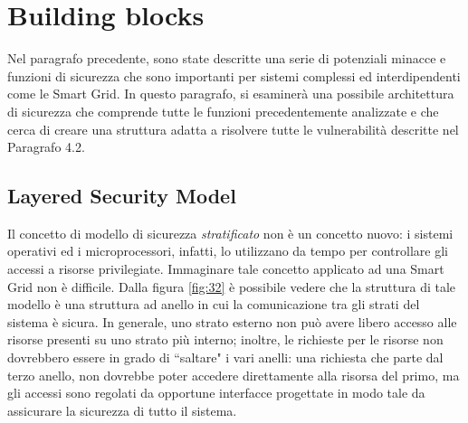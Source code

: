 \section{Building blocks}
Nel paragrafo precedente, sono state descritte una serie di potenziali minacce e funzioni di sicurezza che sono importanti per sistemi complessi ed interdipendenti come le Smart Grid. \newline In questo paragrafo, si esaminerà una possibile architettura di sicurezza che comprende tutte le funzioni precedentemente analizzate e che cerca di creare una struttura adatta a risolvere tutte le vulnerabilità descritte nel Paragrafo 4.2.

\subsection{Layered Security Model}
Il concetto di modello di sicurezza \textit{stratificato} non è un concetto nuovo: i sistemi operativi ed i microprocessori, infatti, lo utilizzano da tempo per controllare gli accessi a  risorse privilegiate. \newline Immaginare tale concetto applicato ad una Smart Grid non è difficile. \newline Dalla figura \ref{fig:32} è possibile vedere che la struttura di tale modello è una struttura ad anello in cui la comunicazione tra gli strati del sistema è sicura. In generale, uno strato esterno non può avere libero accesso alle risorse presenti su uno strato più interno; inoltre, le richieste per le risorse non dovrebbero essere in grado di ``saltare" i vari anelli: una richiesta che parte dal terzo anello, non dovrebbe poter accedere direttamente alla risorsa del primo, ma gli accessi sono regolati da opportune interfacce progettate in modo tale da assicurare la sicurezza di tutto il sistema.

\begin{figure}[h]
\end{figure}

